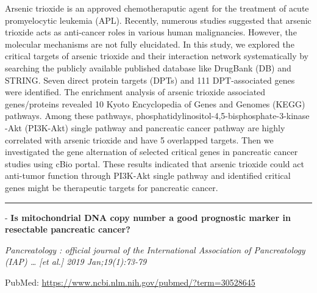 \documentclass[]{article}
\begin{document}
Arsenic trioxide is an approved chemotheraputic agent for the treatment
of acute promyelocytic leukemia (APL). Recently, numerous studies
suggested that arsenic trioxide acts as anti-cancer roles in various
human malignancies. However, the molecular mechanisms are not fully
elucidated. In this study, we explored the critical targets of arsenic
trioxide and their interaction network systematically by searching the
publicly available published database like DrugBank (DB) and STRING.
Seven direct protein targets (DPTs) and 111 DPT-associated genes were
identified. The enrichment analysis of arsenic trioxide associated
genes/proteins revealed 10 Kyoto Encyclopedia of Genes and Genomes
(KEGG) pathways. Among these pathways,
phosphatidylinositol-4,5-bisphosphate-3-kinase -Akt (PI3K-Akt) single
pathway and pancreatic cancer pathway are highly correlated with arsenic
trioxide and have 5 overlapped targets. Then we investigated the gene
alternation of selected critical genes in pancreatic cancer studies
using cBio portal. These results indicated that arsenic trioxide could
act anti-tumor function through PI3K-Akt single pathway and identified
critical genes might be therapeutic targets for pancreatic cancer.

{}

{}

\begin{center}\rule{0.5\linewidth}{\linethickness}\end{center}

 - \textbf{Is mitochondrial DNA copy number a good prognostic marker in
resectable pancreatic cancer?}

\emph{Pancreatology : official journal of the International Association
of Pancreatology (IAP) \ldots{} {[}et al.{]} 2019 Jan;19(1):73-79}

PubMed: \url{https://www.ncbi.nlm.nih.gov/pubmed/?term=30528645}
\end{document}
